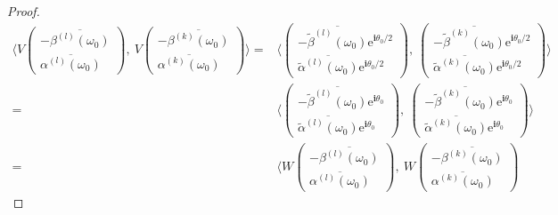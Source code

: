 \documentclass[10pt,a4paper]{amsart}
\begin{document}
\begin{proof}
    \begin{equation*}
    \begin{aligned}
     \langle V
    \begin{pmatrix}
    -\overline{\beta^{(l)}(\omega_0)} \\
    \overline{\alpha^{(l)}(\omega_0)}
    \end{pmatrix},\
    V
   \begin{pmatrix}
   	-\overline{\beta^{(k)}(\omega_0)} \\
   	\overline{\alpha^{(k)}(\omega_0)}
   \end{pmatrix}
    \rangle
    = &      \langle
    \begin{pmatrix}
    	-\overline{\widetilde{\beta}^{(l)}(\omega_0)}\mathrm{e}^{\boldsymbol{i}\theta_0/2} \\
    	\overline{\widetilde{\alpha}^{(l)}(\omega_0)}\mathrm{e}^{\boldsymbol{i}\theta_0/2}
    \end{pmatrix},\
      \begin{pmatrix}
     	-\overline{\widetilde{\beta}^{(k)}(\omega_0)}\mathrm{e}^{\boldsymbol{i}\theta_0/2} \\
     	\overline{\widetilde{\alpha}^{(k)}(\omega_0)}\mathrm{e}^{\boldsymbol{i}\theta_0/2}
     \end{pmatrix}
    \rangle \\
    = &
    \langle
    \begin{pmatrix}
    	-\overline{\widetilde{\beta}^{(l)}(\omega_0)}\mathrm{e}^{\boldsymbol{i}\theta_0} \\
    	\overline{\widetilde{\alpha}^{(l)}(\omega_0)}\mathrm{e}^{\boldsymbol{i}\theta_0}
    \end{pmatrix},\
    \begin{pmatrix}
    	-\overline{\widetilde{\beta}^{(k)}(\omega_0)}\mathrm{e}^{\boldsymbol{i}\theta_0} \\
    	\overline{\widetilde{\alpha}^{(k)}(\omega_0)}\mathrm{e}^{\boldsymbol{i}\theta_0}
    \end{pmatrix}
    \rangle \\
    = & \langle W
    \begin{pmatrix}
    	-\overline{\beta^{(l)}(\omega_0)} \\
    	\overline{\alpha^{(l)}(\omega_0)}
    \end{pmatrix},\
    W
    \begin{pmatrix}
    	-\overline{\beta^{(k)}(\omega_0)} \\
    	\overline{\alpha^{(k)}(\omega_0)}
    \end{pmatrix}

\end{aligned}
\end{equation*}
\end{proof}
\end{document}

